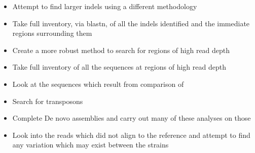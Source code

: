 \documentclass[../main.tex]{subfiles}
\begin{document}
%
%

\begin{itemize}
\item Attempt to find larger indels using a different methodology
\item Take full inventory, via blastn, of all the indels identified and the immediate regions surrounding them 
\item Create a more robust method to search for regions of high read depth
\item Take full inventory of all the sequences at regions of high read depth
\item Look at the sequences which result from comparison of 
\item Search for transposons
\item Complete De novo assemblies and carry out many of these analyses on those
\item Look into the reads which did not align to the reference and attempt to find any variation which may exist between the strains
\end{itemize}
\end{document}
